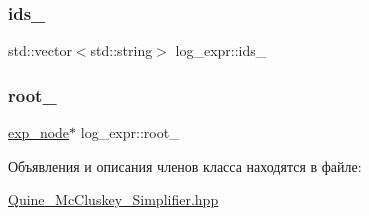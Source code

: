 \subsubsection{\texorpdfstring{ids\+\_\+}{ids\_}}
{\footnotesize\ttfamily std\+::vector$<$std\+::string$>$ log\+\_\+expr\+::ids\+\_\+\hspace{0.3cm}{\ttfamily [private]}}

\mbox{\label{classlog__expr_a3497df2d3c87e5358c39329fcd9c1853}} 
\subsubsection{\texorpdfstring{root\+\_\+}{root\_}}
{\footnotesize\ttfamily \hyperlink{structlog__expr_1_1exp__node}{exp\+\_\+node}$\ast$ log\+\_\+expr\+::root\+\_\+\hspace{0.3cm}{\ttfamily [private]}}



Объявления и описания членов класса находятся в файле\+:\begin{DoxyCompactItemize}
\item 
\hyperlink{_quine___mc_cluskey___simplifier_8hpp}{Quine\+\_\+\+Mc\+Cluskey\+\_\+\+Simplifier.\+hpp}\end{DoxyCompactItemize}

